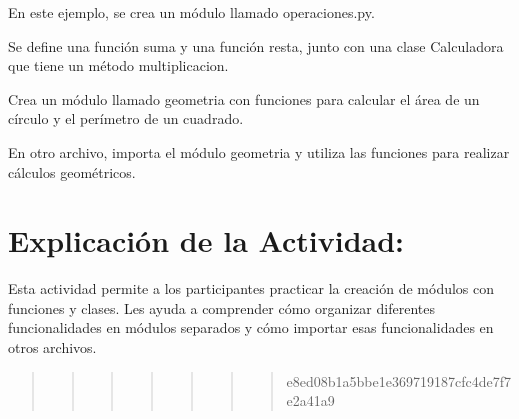 \documentclass[
  a4paper,
  onepage,
  openany]{scrreprt}
\begin{document}
En este ejemplo, se crea un módulo llamado operaciones.py.

Se define una función suma y una función resta, junto con una clase
Calculadora que tiene un método multiplicacion.

\begin{tcolorbox}[enhanced jigsaw, breakable, opacityback=0, toptitle=1mm, coltitle=black, toprule=.15mm, rightrule=.15mm, colframe=quarto-callout-important-color-frame, opacitybacktitle=0.6, arc=.35mm, title=\textcolor{quarto-callout-important-color}{\faExclamation}\hspace{0.5em}{Actividad Práctica:}, titlerule=0mm, colbacktitle=quarto-callout-important-color!10!white, bottomtitle=1mm, bottomrule=.15mm, colback=white, left=2mm, leftrule=.75mm]

Crea un módulo llamado geometria con funciones para calcular el área de
un círculo y el perímetro de un cuadrado.

En otro archivo, importa el módulo geometria y utiliza las funciones
para realizar cálculos geométricos.

\end{tcolorbox}

\hypertarget{explicaciuxf3n-de-la-actividad-59}{%
\section{Explicación de la
Actividad:}\label{explicaciuxf3n-de-la-actividad-59}}

Esta actividad permite a los participantes practicar la creación de
módulos con funciones y clases. Les ayuda a comprender cómo organizar
diferentes funcionalidades en módulos separados y cómo importar esas
funcionalidades en otros archivos.

\begin{quote}
\begin{quote}
\begin{quote}
\begin{quote}
\begin{quote}
\begin{quote}
\begin{quote}
e8ed08b1a5bbe1e369719187cfc4de7f7e2a41a9
\end{quote}
\end{quote}
\end{quote}
\end{quote}
\end{quote}
\end{quote}
\end{quote}
\end{document}
